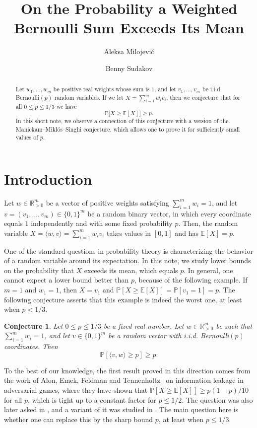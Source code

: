 \documentclass[11pt]{amsart}
\title{ On the Probability a Weighted Bernoulli Sum Exceeds Its Mean}
\date{}
\author{Aleksa Milojevi\'c}
\author{Benny Sudakov}
\newtheorem{conjecture}[theorem]{\bf Conjecture}
\theoremstyle{definition}
\def\bE{\mathbb{E}}
\def\bR{\mathbb{R}}
\def\Pb{\mathbb{P}}
\begin{document}
\maketitle
\vspace{-0.5cm}
\begin{abstract}
Let $w_1, \dots, w_m$ be positive real weights whose sum is $1$, and let $v_1, \dots, v_m$ be i.i.d. Bernoulli$(p)$ random variables. If we let $X=\sum_{i=1}^m w_i v_i$, then we conjecture that for all $0\leq p\leq 1/3$ we have
\[\Pb\big[X\geq \bE[X]\big]\geq p.\] 
In this short note, we observe a connection of this conjecture with a version of the Manickam--Mikl\'os--Singhi conjecture, which allows one to prove it for sufficiently small values of $p$.
\end{abstract}

\section{Introduction}

Let $w\in \bR_{>0}^m$ be a vector of positive weights satisfying $\sum_{i=1}^m w_i=1$, and let $v=(v_1, \dots, v_m)\in \{0, 1\}^m$ be a random binary vector, in which every coordinate equals $1$ independently and with some fixed probability $p$. Then, the random variable $X=\langle w, v\rangle=\sum_{i=1}^m w_iv_i$ takes values in $[0,1]$ and has $\bE[X]=p$. 

One of the standard questions in probability theory is characterizing the behavior of a random variable around its expectation.
In this note, we study lower bounds on the probability that $X$ exceeds its mean, which equals $p$. In general, one cannot expect a lower bound better than $p$, because of the following example. If $m=1$ and $w_1=1$, then $X=v_1$ and $\Pb[X\ge \bE[X]]=\Pb[v_1=1]=p$. The following conjecture asserts that this example is indeed the worst one, at least when $p < 1/3$.

\begin{conjecture}\label{conj:prob}
Let $0\leq p\leq 1/3$ be a fixed real number. Let $w\in \bR_{>0}^m$ be such that $\sum_{i=1}^m w_i=1$, and let $v\in \{0, 1\}^m$ be a random vector with i.i.d. Bernoulli$(p)$ coordinates. Then
\[\Pb[\langle v, w\rangle\geq p]\geq p.\]
\end{conjecture}

To the best of our knowledge, the first result proved in this direction comes from the work of Alon, Emek, Feldman and Tennenholtz~\cite{AEFT13} on information leakage in adversarial games, where they have shown that $\Pb[X\ge \bE[X]]\ge p(1-p)/10$ for all $p$, which is tight up to a constant factor for $p\leq 1/2$. The question was also later asked in \cite{MathStackExchange}, and a variant of it was studied in \cite{FMP23}. The main question here is whether one can replace this by the sharp bound $p$, at least when $p\leq 1/3$.
\end{document}
